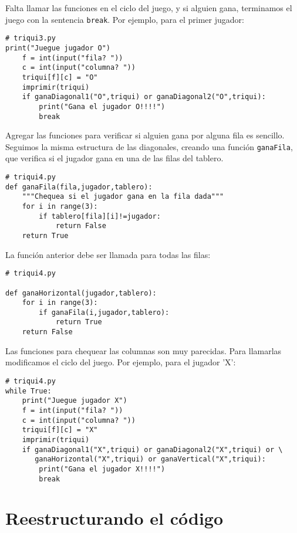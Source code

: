 Falta llamar las funciones en el ciclo del juego, y si alguien gana,
terminamos el juego con la sentencia \texttt{break}. Por ejemplo,
para el primer jugador:

\begin{lstlisting}
# triqui3.py
print("Juegue jugador O")
    f = int(input("fila? "))
    c = int(input("columna? "))
    triqui[f][c] = "O"
    imprimir(triqui)
    if ganaDiagonal1("O",triqui) or ganaDiagonal2("O",triqui):
        print("Gana el jugador O!!!!")
        break
\end{lstlisting}

Agregar las funciones para verificar si alguien gana por alguna fila
es sencillo. Seguimos la misma estructura de las diagonales, creando
una función \texttt{ganaFila}, que verifica si el jugador gana en
una de las filas del tablero.

\begin{lstlisting}
# triqui4.py
def ganaFila(fila,jugador,tablero):
    """Chequea si el jugador gana en la fila dada"""
    for i in range(3):
        if tablero[fila][i]!=jugador:
            return False
    return True
\end{lstlisting}

La función anterior debe ser llamada para todas las filas:

\begin{lstlisting}
# triqui4.py

def ganaHorizontal(jugador,tablero):
    for i in range(3):
        if ganaFila(i,jugador,tablero):
            return True
    return False
\end{lstlisting}

Las funciones para chequear las columnas son muy parecidas. Para llamarlas
modificamos el ciclo del juego. Por ejemplo, para el jugador 'X':

\begin{lstlisting}
# triqui4.py
while True:
    print("Juegue jugador X")
    f = int(input("fila? "))
    c = int(input("columna? "))
    triqui[f][c] = "X"
    imprimir(triqui)
    if ganaDiagonal1("X",triqui) or ganaDiagonal2("X",triqui) or \
       ganaHorizontal("X",triqui) or ganaVertical("X",triqui):
        print("Gana el jugador X!!!!")
        break
\end{lstlisting}

\section{Reestructurando el código}

